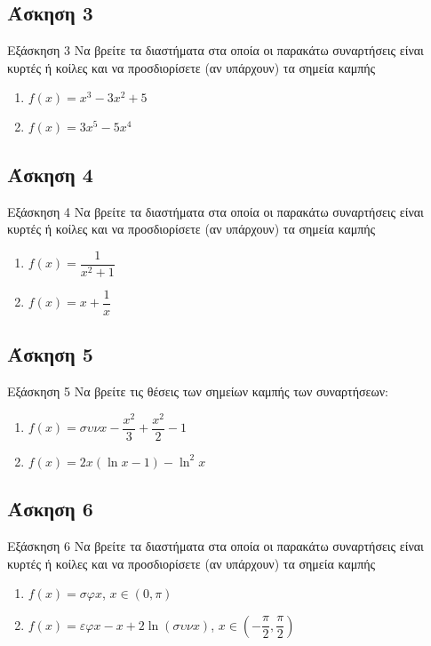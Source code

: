 \documentclass[greek]{beamer}
\begin{document}
\subsection{Άσκηση 3}
\begin{frame}[label=Άσκηση3,t]{Εξάσκηση 3}
 Να βρείτε τα διαστήματα στα οποία οι παρακάτω συναρτήσεις είναι κυρτές ή κοίλες και να προσδιορίσετε (αν υπάρχουν) τα σημεία καμπής
 \begin{enumerate}
   \item<1-> $f(x)=x^3-3x^2+5$
   \item<2-> $f(x)=3x^5-5x^4$
 \end{enumerate}

\end{frame}

\subsection{Άσκηση 4}
\begin{frame}[label=Άσκηση4,t]{Εξάσκηση 4}
 Να βρείτε τα διαστήματα στα οποία οι παρακάτω συναρτήσεις είναι κυρτές ή κοίλες και να προσδιορίσετε (αν υπάρχουν) τα σημεία καμπής
 \begin{enumerate}
  \item<1-> $f(x)=\dfrac{1}{x^2+1}$
  \item<2-> $f(x)=x+\dfrac{1}{x}$
 \end{enumerate}

\end{frame}

\subsection{Άσκηση 5}
\begin{frame}[label=Άσκηση5,t]{Εξάσκηση 5}
 Να βρείτε τις θέσεις των σημείων καμπής των συναρτήσεων:
 \begin{enumerate}
  \item<1-> $f(x)=συνx-\dfrac{x^2}{3}+\dfrac{x^2}{2}-1$
  \item<2-> $f(x)=2x(\ln x-1)-\ln^2x$
 \end{enumerate}

\end{frame}

\subsection{Άσκηση 6}
\begin{frame}[label=Άσκηση6,t]{Εξάσκηση 6}
 Να βρείτε τα διαστήματα στα οποία οι παρακάτω συναρτήσεις είναι κυρτές ή κοίλες και να προσδιορίσετε (αν υπάρχουν) τα σημεία καμπής
 \begin{enumerate}
  \item<1-> $f(x)=σφx$, $x\in (0,\pi)$
  \item<2-> $f(x)=εφx-x+2\ln (συνx)$, $x\in (-\dfrac{\pi}{2},\dfrac{\pi}{2})$
 \end{enumerate}

\end{frame}
\end{document}
